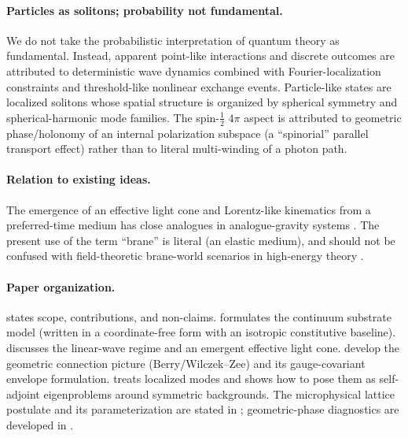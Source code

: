 \paragraph{Particles as solitons; probability not fundamental.}
We do not take the probabilistic interpretation of quantum theory as fundamental.
Instead, apparent point-like interactions and discrete outcomes are attributed to deterministic wave dynamics
combined with Fourier-localization constraints and threshold-like nonlinear exchange events.
Particle-like states are localized solitons whose spatial structure is organized by spherical symmetry and
spherical-harmonic mode families.
The spin-$\tfrac12$ $4\pi$ aspect is attributed to geometric phase/holonomy of an internal polarization
subspace (a ``spinorial'' parallel transport effect) rather than to literal multi-winding of a photon path.

\paragraph{Relation to existing ideas.}
The emergence of an effective light cone and Lorentz-like kinematics from a preferred-time medium has
close analogues in analogue-gravity systems \citep{Barcelo2011AnalogueGravity,Volovik2003HeliumDroplet,Jacobson2004EinsteinAether}.
The present use of the term ``brane'' is literal (an elastic medium), and should not be confused with
field-theoretic brane-world scenarios in high-energy theory \citep{RandallSundrum1999}.

\paragraph{Paper organization.}
 states scope, contributions, and non-claims.
 formulates the continuum substrate model (written in a coordinate-free form with an isotropic constitutive baseline).
 discusses the linear-wave regime and an emergent effective light cone.
 develop the geometric connection picture (Berry/Wilczek--Zee) and its
gauge-covariant envelope formulation.
 treats localized modes and shows how to pose them as self-adjoint eigenproblems around
symmetric backgrounds.
The microphysical lattice postulate and its parameterization are stated in ;
geometric-phase diagnostics are developed in .
